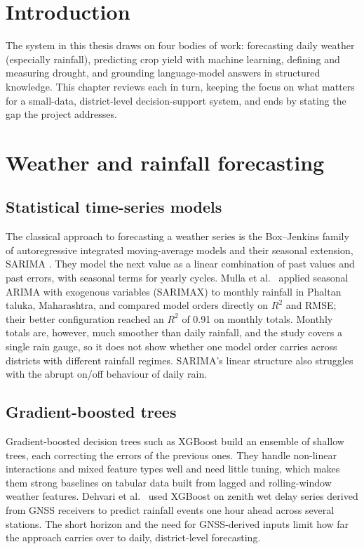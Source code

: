 \label{chap.2}
\section{Introduction}
The system in this thesis draws on four bodies of work: forecasting daily weather (especially rainfall), predicting crop yield with machine learning, defining and measuring drought, and grounding language-model answers in structured knowledge. This chapter reviews each in turn, keeping the focus on what matters for a small-data, district-level decision-support system, and ends by stating the gap the project addresses.

\section{Weather and rainfall forecasting}

\subsection{Statistical time-series models}
The classical approach to forecasting a weather series is the Box--Jenkins family of autoregressive integrated moving-average models and their seasonal extension, SARIMA \cite{box2015time}. They model the next value as a linear combination of past values and past errors, with seasonal terms for yearly cycles. Mulla et al.\ \cite{mulla2024sarimax} applied seasonal ARIMA with exogenous variables (SARIMAX) to monthly rainfall in Phaltan taluka, Maharashtra, and compared model orders directly on $R^2$ and RMSE; their better configuration reached an $R^2$ of 0.91 on monthly totals. Monthly totals are, however, much smoother than daily rainfall, and the study covers a single rain gauge, so it does not show whether one model order carries across districts with different rainfall regimes. SARIMA's linear structure also struggles with the abrupt on/off behaviour of daily rain.

\subsection{Gradient-boosted trees}
Gradient-boosted decision trees such as XGBoost \cite{chen2016xgboost} build an ensemble of shallow trees, each correcting the errors of the previous ones. They handle non-linear interactions and mixed feature types well and need little tuning, which makes them strong baselines on tabular data built from lagged and rolling-window weather features. Dehvari et al.\ \cite{dehvari2025forecasting} used XGBoost on zenith wet delay series derived from GNSS receivers to predict rainfall events one hour ahead across several stations. The short horizon and the need for GNSS-derived inputs limit how far the approach carries over to daily, district-level forecasting.

